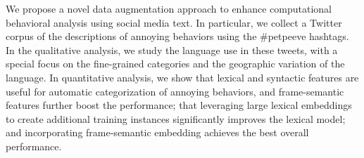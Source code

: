 We propose a novel data augmentation approach to enhance computational behavioral analysis using social media text. In particular, we collect a Twitter corpus of the descriptions of annoying behaviors using the \#petpeeve hashtags. In the qualitative analysis, we study the language use in these tweets, with a special focus on the fine-grained categories and the geographic variation of the language. In quantitative analysis, we show that lexical and syntactic features are useful for automatic categorization of annoying behaviors, and frame-semantic features further boost the performance; that leveraging large lexical embeddings to create additional training instances significantly improves the lexical model; and incorporating frame-semantic embedding achieves the best overall performance.
